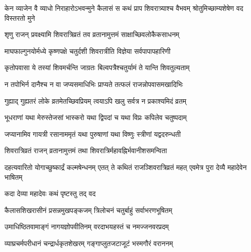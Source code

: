 
\ganapatyadiDhyanam

\padmaPuranam




\threelineshloka
{केन व्याजेन वै व्याधो निराहारोऽभवन्मुने}
{कैलासं स कथं प्राप शिवरात्र्याश्च वैभवम्}
{श्रोतुमिच्छाम्यशेषेण वद विस्तरतो मुने} %


\twolineshloka
{शृणु राजन् प्रवक्ष्यामि शिवरात्रिव्रतं तव}
{व्रतानामुत्तमं साक्षाच्छिवलोकैकसाधनम्} %

\twolineshloka
{माघफाल्गुनयोर्मध्ये कृष्णपक्षे चतुर्दशी}
{शिवरात्रीति विज्ञेया सर्वपापापहारिणी} %

\twolineshloka
{कृतोपवासा ये तस्यां शिवमर्चन्ति जाग्रतः}
{बिल्वपत्रैश्चतुर्यामं ते यान्ति शिवतुल्यताम्} %

\twolineshloka
{न तपोभिर्न दानैश्च न वा जप्यसमाधिभिः}
{प्राप्यते तत्फलं राजन्नोपवासमखादिभिः} %

\twolineshloka
{गुह्याद् गुह्यतरं लोके व्रतमेतच्छिवप्रियम्}
{त्वयाऽपि खलु सर्वत्र न प्रकाश्यमिदं व्रतम्} %

\twolineshloka
{भूधराणां यथा मेरुस्तेजसां भास्करो यथा}
{द्विपदां च यथा विप्रः कपिलेव चतुष्पदाम्} %

\twolineshloka
{जप्यानामिव गायत्री रसानाममृतं यथा}
{पुरुषाणां यथा विष्णुः स्त्रीणां यद्वदरुन्धती} %

\twolineshloka
{शिवरात्रिव्रतं राजन् व्रतानामुत्तमं तथा}
{शिवरात्रिर्महावह्निर्भवानीशसमन्विता} %

\threelineshloka
{दहत्यवारितो योगाच्छुष्कार्द्रं कल्मषेन्धनम्}
{एतत् ते कथितं राजञ्शिवरात्रिव्रतं महत्}
{एवमेत्र पुरा देव्यै महादेवेन भाषितम्} %


\onelineshloka
{कदा देव्या महादेवः कथं पृष्टस्तु तद् वद} %


\twolineshloka
{कैलासशिखरासीनं प्रसन्नमुखपङ्कजम्}
{त्रिलोचनं चतुर्बाहुं सर्वाभरणभूषितम्} %

\twolineshloka
{उमाधिष्ठितवामाङ्गं नागयज्ञोपवीतिनम्}
{वरदाभयहस्तं च नमज्जनवरप्रदम्} %

\twolineshloka
{व्याघ्रचर्मपरीधानं चन्द्रार्धकृतशेखरम्}
{गङ्गाप्लुतजटाजूटं भस्मगौरं वराननम्} %

